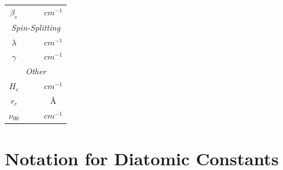 \documentclass[11pt, twoside, fleqn]{report}
\begin{document}
\begin{table}[H]
\begin{tabular}{cccc}
        $\beta_e$     &                           &                         & $\unit{cm^{-1}}$ \\
        \multicolumn{4}{c}{\textit{Spin-Splitting}}                                            \\
        \cmidrule(lr){1-4}
        $\lambda$     &                           &                         & $\unit{cm^{-1}}$ \\
        $\gamma$      &                           &                         & $\unit{cm^{-1}}$ \\
        \multicolumn{4}{c}{\textit{Other}}                                                     \\
        \cmidrule(lr){1-4}
        $H_e$         &                           &                         & $\unit{cm^{-1}}$ \\
        $r_e$         &                           &                         & \AA              \\
        $\nu_{00}$    &                           &                         & $\unit{cm^{-1}}$ \\
        \bottomrule
    \end{tabular}
\end{table}

\chapter{Notation for Diatomic Constants}
\label{a:notation_for_diatomic_constants}
\end{document}
